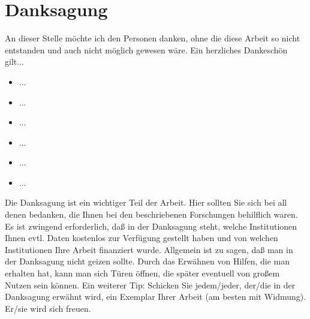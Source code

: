 \chapter*{Danksagung}
An dieser Stelle möchte ich den Personen danken, ohne die diese Arbeit so nicht entstanden und auch nicht möglich gewesen wäre. Ein herzliches Dankeschön gilt...
\begin{itemize}
\item ... 
\item ... 
\item ...  
\item ... 
\item ... 
\item ... 
\end{itemize}

Die Danksagung ist ein wichtiger Teil der Arbeit. Hier sollten Sie sich
bei all denen bedanken, die Ihnen bei den beschriebenen Forschungen behilflich waren. Es ist
zwingend erforderlich, daß in der Danksagung steht, welche Institutionen Ihnen evtl. Daten
kostenlos zur Verfügung gestellt haben und von welchen Institutionen Ihre Arbeit finanziert
wurde. Allgemein ist zu sagen, daß
man in der Danksagung nicht geizen sollte. Durch das Erwähnen von Hilfen, die man erhalten
hat, kann man sich Türen öffnen, die später eventuell von großem Nutzen sein können. Ein
weiterer Tip: Schicken Sie jedem/jeder, der/die in der Danksagung erwähnt wird, ein
Exemplar Ihrer Arbeit (am besten mit Widmung). Er/sie wird sich freuen.